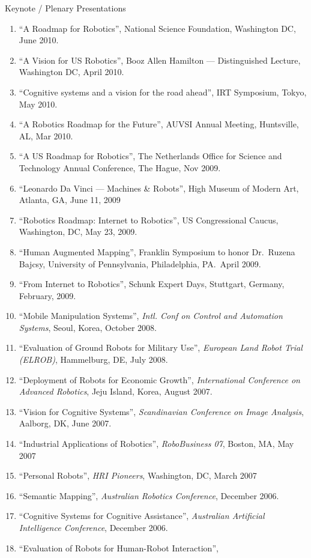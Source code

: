 \documentclass{article}
\begin{document}
\begin{cv}
\begin{cvlist}{Keynote / Plenary Presentations}
\begin{enumerate}
  \item ``A Roadmap for Robotics'', National Science Foundation,  Washington DC, June 2010.
  \item ``A Vision for US Robotics'', Booz Allen Hamilton ---  Distinguished Lecture, Washington DC, April 2010.
  \item ``Cognitive systems and a vision for the road ahead'', IRT  Symposium, Tokyo, May 2010.
  \item ``A Robotics Roadmap for the Future'', AUVSI Annual Meeting, Huntsville, AL, Mar 2010.
  \item ``A US Roadmap for Robotics'', The Netherlands Office for Science and Technology Annual Conference, The Hague, Nov 2009.
  \item ``Leonardo Da Vinci --- Machines \& Robots'', High Museum of Modern Art, Atlanta, GA, June 11, 2009
  \item ``Robotics Roadmap: Internet to Robotics'', US Congressional Caucus, Washington, DC, May 23, 2009.
  \item ``Human Augmented Mapping'', Franklin Symposium to honor Dr.\ Ruzena Bajcsy, University of Pennsylvania, Philadelphia,
    PA.\ April 2009.
  \item ``From Internet to Robotics'', Schunk Expert Days, Stuttgart, Germany, February, 2009.
  \item ``Mobile Manipulation Systems'', {\em Intl. Conf on Control
    and Automation Systems}, Seoul, Korea, October 2008.
  \item ``Evaluation of Ground Robots for Military Use'', {\em
    European Land Robot Trial (ELROB)}, Hammelburg, DE, July 2008.
  \item ``Deployment of Robots for Economic Growth'', {\em
    International Conference on Advanced Robotics}, Jeju Island,
    Korea, August 2007.
  \item ``Vision for Cognitive Systems'', {\em Scandinavian Conference
    on Image Analysis}, Aalborg, DK, June 2007.
  \item ``Industrial Applications of Robotics'', {\em RoboBusiness
    07}, Boston, MA, May 2007
  \item ``Personal Robots'', {\em HRI Pioneers}, Washington, DC, March
    2007
  \item ``Semantic Mapping'', {\em Australian Robotics Conference},
    December 2006.
  \item ``Cognitive Systems for Cognitive Assistance'', {\em
    Australian Artificial Intelligence Conference}, December 2006.
  \item ``Evaluation of Robots for Human-Robot Interaction'', {\em
}
\end{enumerate}
\end{cvlist}
\end{cv}
\end{document}
